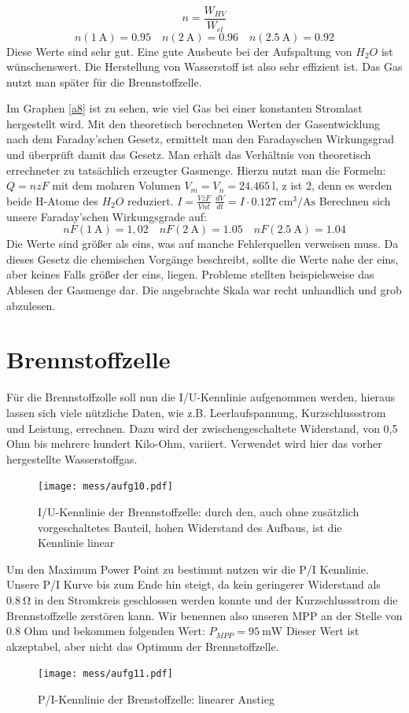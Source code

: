 \[ n=\frac{W_{HV}}{W_{el}} \]
\[
n(\SI{1}{\ampere})=0.95 \quad
n(\SI{2}{\ampere})=0.96 \quad
n(\SI{2,5}{\ampere})=0.92
\]
Diese Werte sind sehr gut. Eine gute Ausbeute bei der Aufspaltung von $H_2O$ ist wünschenswert.
Die Herstellung von Wasserstoff ist also sehr effizient ist. Das Gas nutzt man später für die Brennstoffzelle.

Im Graphen \ref{a8} ist zu sehen, wie viel Gas bei einer konstanten Stromlast hergestellt wird. Mit den theoretisch berechneten Werten der Gasentwicklung nach dem Faraday’schen Gesetz, ermittelt man den Faradayschen Wirkungsgrad und überprüft damit das Gesetz. Man erhält das Verhältnis von theoretisch errechneter zu tatsächlich erzeugter Gasmenge.
Hierzu nutzt man die Formeln:
$Q=nzF$
mit dem molaren Volumen $V_m=V_n=\SI{24,465}{\litre}$,
z ist 2, denn es werden beide H-Atome des $H_2O$ reduziert.
$I=\frac{VzF}{Vnt}$
$\frac{dV}{dt}=I \cdot \SI{0.127}{\centi \meter \cubed \per \ampere \second}$
Berechnen sich unsere Faraday’schen Wirkungsgrade auf:
\[
nF(\SI{1}{\ampere})=1,02 \quad nF(\SI{2}{\ampere}) = 1.05 \quad nF(\SI{2.5}{\ampere})=1.04
\]
Die Werte sind größer als eins, was auf manche Fehlerquellen verweisen muss. Da dieses Gesetz die chemischen Vorgänge beschreibt, sollte die Werte nahe der eins, aber keines Falls größer der eins, liegen.
Probleme stellten beispielsweise das Ablesen der Gasmenge dar.
Die angebrachte Skala war recht unhandlich und grob abzulesen.


\section{Brennstoffzelle}

Für die Brennstoffzolle soll nun die I/U-Kennlinie aufgenommen werden, hieraus lassen sich viele nützliche Daten, wie z.B. Leerlaufspannung, Kurzschlussstrom und Leistung, errechnen. Dazu wird der zwischengeschaltete Widerstand, von 0,5 Ohm bis mehrere hundert Kilo-Ohm, variiert. Verwendet wird hier das vorher hergestellte Wasserstoffgas.
\begin{figure}
	\centering
	\texttt{[image: mess/aufg10.pdf]}
	\caption{I/U-Kennlinie der Brennstoffzelle: durch den, auch ohne zusätzlich vorgeschaltetes Bauteil, hohen Widerstand des Aufbaus, ist die Kennlinie linear}
	\label{a10}
\end{figure}

Um den Maximum Power Point zu bestimmt nutzen wir die P/I Kennlinie. Unsere P/I Kurve bis zum Ende hin steigt, da kein geringerer Widerstand als $\SI{0,8}{\ohm}$  in den Stromkreis geschlossen werden konnte und der Kurzschlussstrom die Brennstoffzelle zerstören kann.
Wir benennen also unseren MPP an der Stelle von 0.8 Ohm und bekommen folgenden Wert: $P_{MPP} = \SI{95}{\milli \watt}$
Dieser Wert ist akzeptabel, aber nicht das Optimum der Brennstoffzelle.
\begin{figure}[htbp]
	\centering
	\texttt{[image: mess/aufg11.pdf]}
	\caption{P/I-Kennlinie der Brenstoffzelle: linearer Anstieg}
	\label{a11}
\end{figure}

